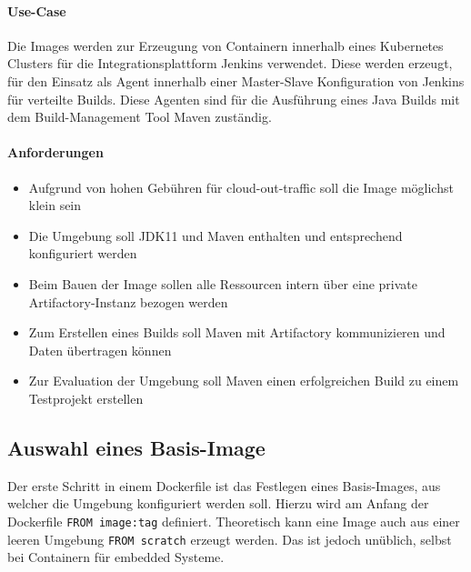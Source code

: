 \paragraph{Use-Case}
Die Images werden zur Erzeugung von Containern innerhalb eines Kubernetes Clusters für die Integrationsplattform Jenkins verwendet. Diese werden erzeugt, für den Einsatz als Agent innerhalb einer Master-Slave Konfiguration von Jenkins für verteilte Builds. Diese Agenten sind für die Ausführung eines Java Builds mit dem Build-Management Tool Maven zuständig.

\paragraph{Anforderungen}
\begin{itemize}
    \item Aufgrund von hohen Gebühren für cloud-out-traffic soll die Image möglichst klein sein
    \item Die Umgebung soll \ac{JDK11} und Maven enthalten und entsprechend konfiguriert werden
    \item Beim Bauen der Image sollen alle Ressourcen intern über eine private Artifactory-Instanz bezogen werden
    \item Zum Erstellen eines Builds soll Maven mit Artifactory kommunizieren und Daten übertragen können
    \item Zur Evaluation der Umgebung soll Maven einen erfolgreichen Build zu einem Testprojekt erstellen
\end{itemize}



\subsection{Auswahl eines Basis-Image}
Der erste Schritt in einem Dockerfile ist das Festlegen eines Basis-Images, aus welcher die Umgebung konfiguriert werden soll. Hierzu wird am Anfang der Dockerfile \lstinline{FROM image:tag} definiert. Theoretisch kann eine Image auch aus einer leeren Umgebung \lstinline{FROM scratch} erzeugt werden. Das ist jedoch unüblich, selbst bei Containern für embedded Systeme.

